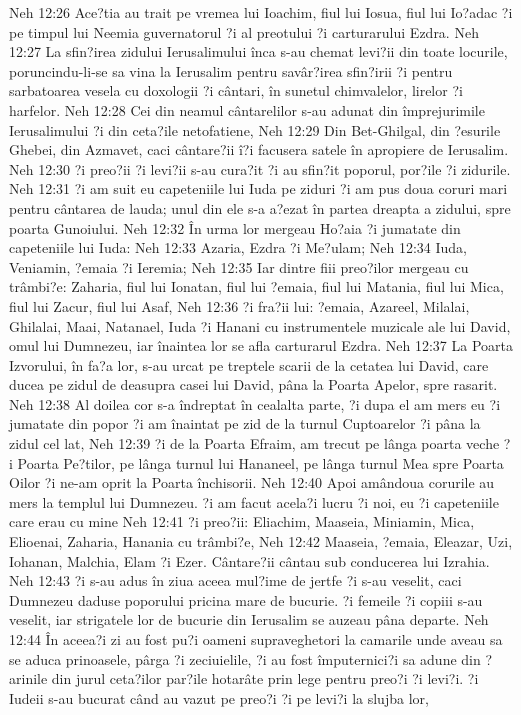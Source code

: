 Neh 12:26  Ace?tia au trait pe vremea lui Ioachim, fiul lui Iosua, fiul lui Io?adac ?i pe timpul lui Neemia guvernatorul ?i al preotului ?i carturarului Ezdra.
Neh 12:27  La sfin?irea zidului Ierusalimului înca s-au chemat levi?ii din toate locurile, poruncindu-li-se sa vina la Ierusalim pentru savâr?irea sfin?irii ?i pentru sarbatoarea vesela cu doxologii ?i cântari, în sunetul chimvalelor, lirelor ?i harfelor.
Neh 12:28  Cei din neamul cântarelilor s-au adunat din împrejurimile Ierusalimului ?i din ceta?ile netofatiene,
Neh 12:29  Din Bet-Ghilgal, din ?esurile Ghebei, din Azmavet, caci cântare?ii î?i facusera satele în apropiere de Ierusalim.
Neh 12:30  ?i preo?ii ?i levi?ii s-au cura?it ?i au sfin?it poporul, por?ile ?i zidurile.
Neh 12:31  ?i am suit eu capeteniile lui Iuda pe ziduri ?i am pus doua coruri mari pentru cântarea de lauda; unul din ele s-a a?ezat în partea dreapta a zidului, spre poarta Gunoiului.
Neh 12:32  În urma lor mergeau Ho?aia ?i jumatate din capeteniile lui Iuda:
Neh 12:33  Azaria, Ezdra ?i Me?ulam;
Neh 12:34  Iuda, Veniamin, ?emaia ?i Ieremia;
Neh 12:35  Iar dintre fiii preo?ilor mergeau cu trâmbi?e: Zaharia, fiul lui Ionatan, fiul lui ?emaia, fiul lui Matania, fiul lui Mica, fiul lui Zacur, fiul lui Asaf,
Neh 12:36  ?i fra?ii lui: ?emaia, Azareel, Milalai, Ghilalai, Maai, Natanael, Iuda ?i Hanani cu instrumentele muzicale ale lui David, omul lui Dumnezeu, iar înaintea lor se afla carturarul Ezdra.
Neh 12:37  La Poarta Izvorului, în fa?a lor, s-au urcat pe treptele scarii de la cetatea lui David, care ducea pe zidul de deasupra casei lui David, pâna la Poarta Apelor, spre rasarit.
Neh 12:38  Al doilea cor s-a îndreptat în cealalta parte, ?i dupa el am mers eu ?i jumatate din popor ?i am înaintat pe zid de la turnul Cuptoarelor ?i pâna la zidul cel lat,
Neh 12:39  ?i de la Poarta Efraim, am trecut pe lânga poarta veche ?i Poarta Pe?tilor, pe lânga turnul lui Hananeel, pe lânga turnul Mea spre Poarta Oilor ?i ne-am oprit la Poarta închisorii.
Neh 12:40  Apoi amândoua corurile au mers la templul lui Dumnezeu. ?i am facut acela?i lucru ?i noi, eu ?i capeteniile care erau cu mine
Neh 12:41  ?i preo?ii: Eliachim, Maaseia, Miniamin, Mica, Elioenai, Zaharia, Hanania cu trâmbi?e,
Neh 12:42  Maaseia, ?emaia, Eleazar, Uzi, Iohanan, Malchia, Elam ?i Ezer. Cântare?ii cântau sub conducerea lui Izrahia.
Neh 12:43  ?i s-au adus în ziua aceea mul?ime de jertfe ?i s-au veselit, caci Dumnezeu daduse poporului pricina mare de bucurie. ?i femeile ?i copiii s-au veselit, iar strigatele lor de bucurie din Ierusalim se auzeau pâna departe.
Neh 12:44  În aceea?i zi au fost pu?i oameni supraveghetori la camarile unde aveau sa se aduca prinoasele, pârga ?i zeciuielile, ?i au fost împuternici?i sa adune din ?arinile din jurul ceta?ilor par?ile hotarâte prin lege pentru preo?i ?i levi?i. ?i Iudeii s-au bucurat când au vazut pe preo?i ?i pe levi?i la slujba lor,
